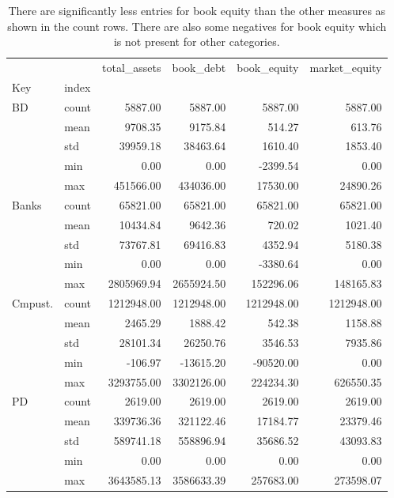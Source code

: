 \documentclass{article}
\begin{document}
\begin{adjustbox}{max width=\textwidth}
\begin{table}
\caption{There are significantly less entries for book equity than the other measures as shown in the count rows. There are also some negatives for book equity which is not present for other categories. }
\label{tab:Table 2.1}
\begin{tabular}{llrrrr}
\toprule
 &  & total_assets & book_debt & book_equity & market_equity \\
Key & index &  &  &  &  \\
\midrule
{BD} & count & 5887.00 & 5887.00 & 5887.00 & 5887.00 \\
 & mean & 9708.35 & 9175.84 & 514.27 & 613.76 \\
 & std & 39959.18 & 38463.64 & 1610.40 & 1853.40 \\
 & min & 0.00 & 0.00 & -2399.54 & 0.00 \\
 & max & 451566.00 & 434036.00 & 17530.00 & 24890.26 \\
\cline{1-6}
{Banks} & count & 65821.00 & 65821.00 & 65821.00 & 65821.00 \\
 & mean & 10434.84 & 9642.36 & 720.02 & 1021.40 \\
 & std & 73767.81 & 69416.83 & 4352.94 & 5180.38 \\
 & min & 0.00 & 0.00 & -3380.64 & 0.00 \\
 & max & 2805969.94 & 2655924.50 & 152296.06 & 148165.83 \\
\cline{1-6}
{Cmpust.} & count & 1212948.00 & 1212948.00 & 1212948.00 & 1212948.00 \\
 & mean & 2465.29 & 1888.42 & 542.38 & 1158.88 \\
 & std & 28101.34 & 26250.76 & 3546.53 & 7935.86 \\
 & min & -106.97 & -13615.20 & -90520.00 & 0.00 \\
 & max & 3293755.00 & 3302126.00 & 224234.30 & 626550.35 \\
\cline{1-6}
{PD} & count & 2619.00 & 2619.00 & 2619.00 & 2619.00 \\
 & mean & 339736.36 & 321122.46 & 17184.77 & 23379.46 \\
 & std & 589741.18 & 558896.94 & 35686.52 & 43093.83 \\
 & min & 0.00 & 0.00 & 0.00 & 0.00 \\
 & max & 3643585.13 & 3586633.39 & 257683.00 & 273598.07 \\
\cline{1-6}
\bottomrule
\end{tabular}
\end{table}
\end{adjustbox}
\end{document}
